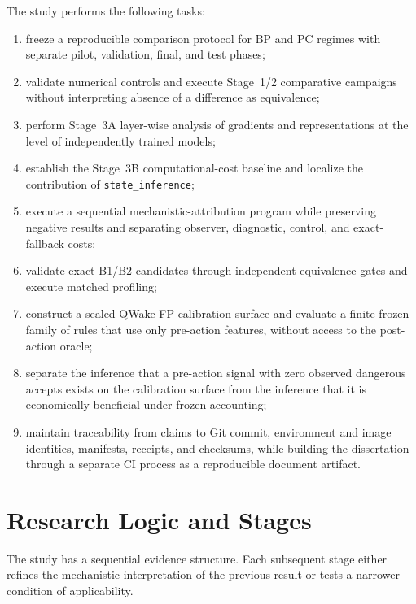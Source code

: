 The study performs the following tasks:
\begin{enumerate}
  \item freeze a reproducible comparison protocol for BP and PC regimes with separate pilot, validation, final, and test phases;
  \item validate numerical controls and execute Stage~1/2 comparative campaigns without interpreting absence of a difference as equivalence;
  \item perform Stage~3A layer-wise analysis of gradients and representations at the level of independently trained models;
  \item establish the Stage~3B computational-cost baseline and localize the contribution of \texttt{state\_inference};
  \item execute a sequential mechanistic-attribution program while preserving negative results and separating observer, diagnostic, control, and exact-fallback costs;
  \item validate exact B1/B2 candidates through independent equivalence gates and execute matched profiling;
  \item construct a sealed QWake-FP calibration surface and evaluate a finite frozen family of rules that use only pre-action features, without access to the post-action oracle;
  \item separate the inference that a pre-action signal with zero observed dangerous accepts exists on the calibration surface from the inference that it is economically beneficial under frozen accounting;
  \item maintain traceability from claims to Git commit, environment and image identities, manifests, receipts, and checksums, while building the dissertation through a separate CI process as a reproducible document artifact.
\end{enumerate}

\section{Research Logic and Stages}
\label{sec:intro-logic-en}

The study has a sequential evidence structure. Each subsequent stage either refines
the mechanistic interpretation of the previous result or tests a narrower condition
of applicability.

